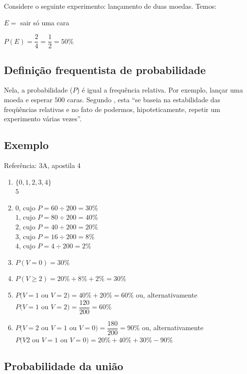 \documentclass[a4paper]{article}
\begin{document}
	Considere o seguinte experimento: lançamento de duas moedas. Temos:
	
	$E =$ sair só uma cara
	
	$P(E) = \dfrac{2}{4} = \dfrac{1}{2} = 50\%$
	
	\subsection{Definição frequentista de probabilidade}
	
	Nela, a probabilidade ($P$) é igual a frequência relativa. Por exemplo, lançar uma moeda e esperar $500$ caras. Segundo , esta ``se baseia na estabilidade das freqüências relativas e no fato
	de podermos, hipoteticamente, repetir um experimento várias vezes''.
	
	\subsection{Exemplo}
	
	\noindent Referência: 3A, apostila 4
	
	\begin{enumerate}[label=\alph*.]
		\item $\{0,1,2,3,4\}$ \\ $5$
		\item $0$, cujo $P = 60 \div 200 = 30\%$ \\
			$1$, cujo $P = 80 \div 200 = 40\%$ \\ 
			$2$, cujo $P = 40 \div 200 = 20\%$ \\
			$3$, cujo $P = 16 \div 200 = 8\%$ \\
			$4$, cujo $P = 4 \div 200 = 2\%$
		\item $P(V=0) = 30\%$
		\item $P(V \geq 2) = 20\% + 8\% + 2\% = 30\%$
		\item $P(V=1$ ou $V=2) = 40\% + 20\% = 60\%$ ou, alternativamente \\
			$P(V=1$ ou $V=2) = \dfrac{120}{200} = 60\%$
		\item $P(V=2$ ou $V=1$ ou $V=0) = \dfrac{180}{200} = 90\%$ ou, alternativamente \\
			$P(V2$ ou $V=1$ ou $V=0) = 20\% + 40\% + 30\% - 90\%$
	\end{enumerate}
	
	\subsection{Probabilidade da união}
	
\end{document}
